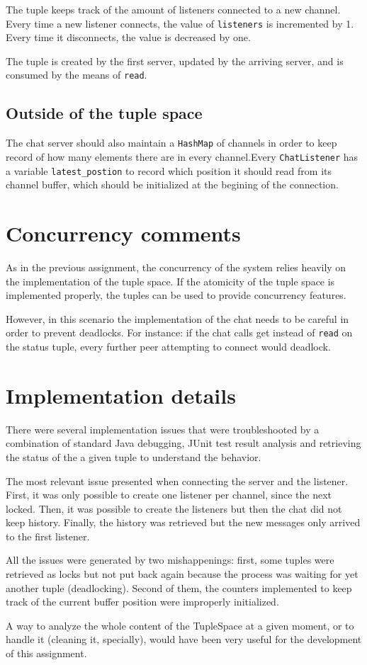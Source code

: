 \documentclass[paper=a4, fontsize=11pt]{scrartcl} %
\begin{document}
The tuple keeps track of the amount of listeners connected to a new channel. Every time a new listener connects, the value of \verb|listeners| is incremented by 1. Every time it disconnects, the value is decreased by one.

The tuple is created by the first server, updated by the arriving server, and is consumed by the means of \verb|read|.

\subsection{Outside of the tuple space}

The chat server should also maintain a \verb|HashMap| of channels in order to keep record of how many elements there are in every channel.Every \verb|ChatListener| has a variable \verb|latest_postion| to record which position it should read from its channel buffer, which should be initialized at the begining of the connection.


\section{Concurrency comments}

As in the previous assignment, the concurrency of the system relies heavily on the implementation of the tuple space. If the atomicity of the tuple space is implemented properly, the tuples can be used to provide concurrency features.

However, in this scenario the implementation of the chat needs to be careful in order to prevent deadlocks. For instance: if the chat calls get instead of \verb|read| on the status tuple, every further peer attempting to connect would deadlock.
	
\section{Implementation details}

There were several implementation issues that were troubleshooted by a combination of standard Java debugging, JUnit test result analysis and retrieving the status of the a given tuple to understand the behavior.

The most relevant issue presented when connecting the server and the listener. First, it was only possible to create one listener per channel, since the next locked. Then, it was possible to create the listeners but then the chat did not keep history. Finally, the history was retrieved but the new messages only arrived to the first listener.

All the issues were generated by two mishappenings: first, some tuples were retrieved as locks but not put back again because the process was waiting for yet another tuple (deadlocking). Second of them, the counters implemented to keep track of the current buffer position were improperly initialized. 

A way to analyze the whole content of the TupleSpace at a given moment, or to handle it (cleaning it, specially), would have been very useful for the development of this assignment.
\end{document}
